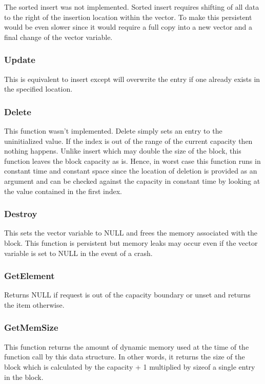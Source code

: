 \documentclass[twocolumn]{article}
\begin{document}
The sorted insert was not implemented. Sorted insert requires shifting of all
data to the right of the insertion location within the vector. To make this
persistent would be even slower since it would require a full copy into a new
vector and a final change of the vector variable.

\subsubsection{Update}

This is equivalent to insert except will overwrite the entry if one already
exists in the specified location.

\subsubsection{Delete}

This function wasn't implemented. Delete simply sets an entry to the
uninitialized value. If the index is out of the range of the current capacity
then nothing happens. Unlike insert which may double the size of the block, this
function leaves the block capacity as is. Hence, in worst case this function
runs in constant time and constant space since the location of deletion is
provided as an argument and can be checked against the capacity in constant time
by looking at the value contained in the first index.

\subsubsection{Destroy}

This sets the vector variable to NULL and frees the memory associated with the
block. This function is persistent but memory leaks may occur even if the vector
variable is set to NULL in the event of a crash.

\subsubsection{GetElement}

Returns NULL if request is out of the capacity boundary or unset and returns the
item otherwise.

\subsubsection{GetMemSize}

This function returns the amount of dynamic memory used at the time of the
function call by this data structure. In other words, it returns the size of the
block which is calculated by the capacity + 1 multiplied by sizeof a single
entry in the block.
\end{document}

